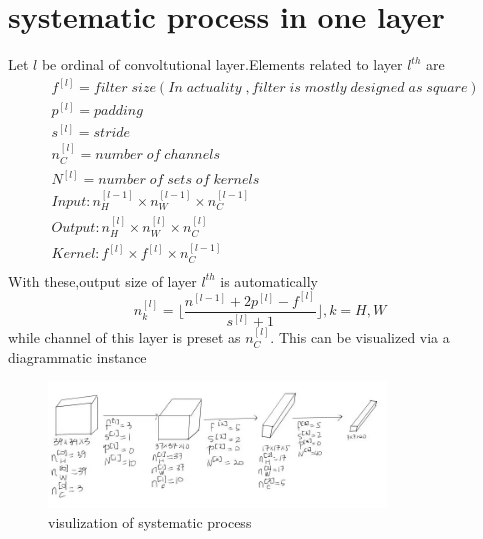 \documentclass{article}
\begin{document}
\section{systematic process in one layer}
Let $l$ be ordinal of convoltutional layer.Elements related to layer $l^{th}$ are
\begin{align*}
	&f^{[l]}=filter\;size(In\;actuality\;,filter\;is\;mostly\;designed\;as\;square)\\
	&p^{[l]}=padding\\
	&s^{[l]}=stride\\
	&n^{[l]}_C=number\;of\;channels\\
	&N^{[l]}=number\;of\;sets\;of\;kernels\\
	&Input:n^{[l-1]}_H\times n^{[l-1]}_W\times n^{[l-1]}_C\\
	&Output:n^{[l]}_H\times n^{[l]}_W\times n^{[l]}_C\\
	&Kernel:f^{[l]}\times f^{[l]}\times n^{[l-1]}_C\\
\end{align*}
With these,output size of layer $l^{th}$ is automatically
$$n^{[l]}_k=\lfloor\frac{n^{[l-1]}+2p^{[l]}-f^{[l]}}{s^{[l]}+1}\rfloor,k=H,W$$
while channel of this layer is preset as $n^{[l]}_C$.
This can be visualized via a diagrammatic instance
\begin{figure}[htbp]
	\centering
	\includegraphics[width=0.8\textwidth]{2.jpg}
	\caption{visulization of systematic process}
\end{figure}
\vspace{\textheight}
\end{document}
